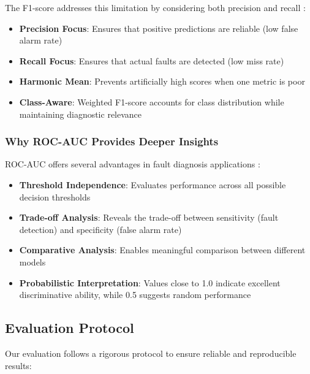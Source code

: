 The F1-score addresses this limitation by considering both precision and recall \citep{hastie2009elements, saito2015precision}:

\begin{itemize}
    \item \textbf{Precision Focus}: Ensures that positive predictions are reliable (low false alarm rate)
    \item \textbf{Recall Focus}: Ensures that actual faults are detected (low miss rate)
    \item \textbf{Harmonic Mean}: Prevents artificially high scores when one metric is poor
    \item \textbf{Class-Aware}: Weighted F1-score accounts for class distribution while maintaining diagnostic relevance
\end{itemize}

\subsubsection{Why ROC-AUC Provides Deeper Insights}
\label{subsubsec:roc_insights}

ROC-AUC offers several advantages in fault diagnosis applications \citep{davis2006relationship, hastie2009elements}:

\begin{itemize}
    \item \textbf{Threshold Independence}: Evaluates performance across all possible decision thresholds
    \item \textbf{Trade-off Analysis}: Reveals the trade-off between sensitivity (fault detection) and specificity (false alarm rate)
    \item \textbf{Comparative Analysis}: Enables meaningful comparison between different models
    \item \textbf{Probabilistic Interpretation}: Values close to 1.0 indicate excellent discriminative ability, while 0.5 suggests random performance
\end{itemize}

\subsection{Evaluation Protocol}
\label{subsec:evaluation_protocol}

Our evaluation follows a rigorous protocol to ensure reliable and reproducible results:

